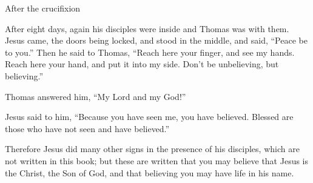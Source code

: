 \documentclass[10pt,twoside]{article} %
\begin{document}
\begin{section}{After the crucifixion}
{  After eight days, again his disciples were inside and Thomas was with them. Jesus came, the doors being locked, and stood in the middle, and said, ``Peace be to you.''   Then he said to Thomas, ``Reach here your finger, and see my hands. Reach here your hand, and put it into my side. Don't be unbelieving, but believing.''

  Thomas answered him, ``My Lord and my God!''

  Jesus said to him, ``Because you have seen me, you have believed. Blessed are those who have not seen and have believed.''

  Therefore Jesus did many other signs in the presence of his disciples, which are not written in this book;   but these are written that you may believe that Jesus is the Christ, the Son of God, and that believing you may have life in his name. 
}

\end{section}

\end{document}
